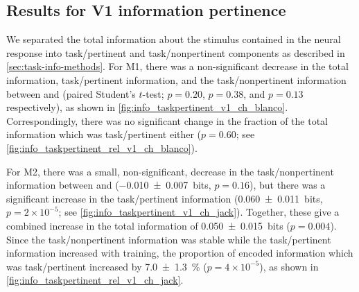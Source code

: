 \subsection{Results for \acs{V1} information pertinence}

We separated the total information about the stimulus contained in the neural response into task\-/pertinent and task\-/nonpertinent components as described in \autoref{sec:task-info-methods}.
For \ac{M1}, there was a non-significant decrease in the total information, task\-/pertinent information, and the task\-/nonpertinent information between  and  (paired Student's $t$-test; $p=0.20$, $p=0.38$, and $p=0.13$ respectively), as shown in \autoref{fig:info_taskpertinent_v1_ch_blanco}.
Correspondingly, there was no significant change in the fraction of the total information which was task\-/pertinent either ($p=0.60$; see \autoref{fig:info_taskpertinent_rel_v1_ch_blanco}).

For \ac{M2}, there was a small, non-significant, decrease in the task\-/nonpertinent information between  and  (\SI{-0.010\pm0.007}{bits}, $p=0.16$), but there was a significant increase in the task\-/pertinent information (\SI{+0.060\pm0.011}{bits}, $p = 2 \times 10^{-5}$; see \autoref{fig:info_taskpertinent_v1_ch_jack}).
Together, these give a combined increase in the total information of \SI{+0.050\pm0.015}{bits} ($p=0.004$).
Since the task\-/nonpertinent information was stable while the task\-/pertinent information increased with training, the proportion of encoded information which was task\-/pertinent increased by \SI{+7.0\pm1.3}{\percent} ($p = 4 \times 10^{-5}$), as shown in \autoref{fig:info_taskpertinent_rel_v1_ch_jack}.

%
%
%
%

